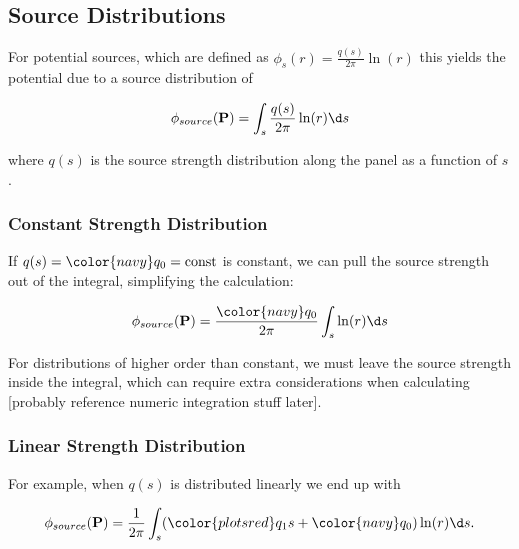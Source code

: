 \subsection{Source Distributions}

For potential sources, which are defined as \(\phi_s(r) = \frac{q(s)}{2\pi}\ln(r)\) this yields the potential due to a source distribution of

\[\phi_{source}(\mathbf{P}) =  \int_s \frac{q(s)}{2\pi} \ln(r) \d s\]

\noindent where \(q(s)\) is the source strength distribution along the panel as a function of \(s\).



\subsubsection{Constant Strength Distribution}

\begin{marginfigure}
	
\end{marginfigure}


If \(q(s) = {\color{navy}q_0} = \mathrm{const}\) is constant, we can pull the source strength out of the integral, simplifying the calculation:

\begin{equation}
\label{eqn:constantsourcedist}
	\phi_{source}(\mathbf{P}) = \frac{\color{navy}q_0}{2\pi} \int_s \ln(r) \d s
\end{equation}

\noindent For distributions of higher order than constant, we must leave the source strength inside the integral, which can require extra considerations when calculating [probably reference numeric integration stuff later].


\subsubsection{Linear Strength Distribution}

For example, when \(q(s)\) is distributed linearly we end up with

\[\phi_{source}(\mathbf{P}) = \frac{1}{2\pi} \int_s ({\color{plotsred}q_1}s + {\color{navy}q_0}) \ln(r) \d s.\]

\begin{marginfigure}
	
\end{marginfigure}

